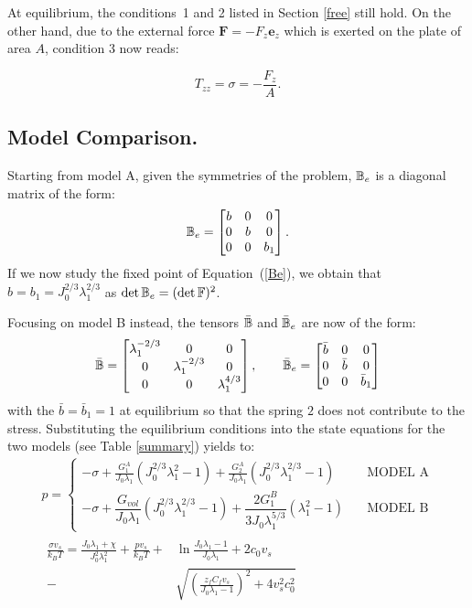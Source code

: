 At equilibrium, the conditions~1 and 2 listed in Section \ref{free} still hold. On the other hand, due to the external force $\mathbf{F}= -F_z \mathbf{e}_z$ which is exerted on the plate of area $A$, condition 3 now reads:

\begin{equation}
T_{zz}=\sigma = -\frac{F_z}{A}.
\end{equation} 

\subsection{Model Comparison.}
\label{data}
Starting from model A, given the symmetries of the problem, $\mathbb{B}_e$ is a diagonal matrix of the form:
\begin{equation}
\mathbb{B}_e=\begin{bmatrix}
b &0&0\\
0&b&0\\
0&0& b_1
\end{bmatrix}. 
\end{equation}
If we now study the fixed point of Equation~(\ref{Be}), we obtain that $b=b_1=J_0^{2/3}\lambda_1^{2/3}$ as $\det \mathbb{B}_e= (\det \mathbb{F})^2$.

Focusing on model B instead, the tensors $\bar{\mathbb{B}}$ and $\bar{\mathbb{B}}_e$ are now of the form:
\begin{equation}
\bar{\mathbb{B}}=\begin{bmatrix}
\lambda_1^{-2/3} &0&0\\
0&\lambda_1^{-2/3}&0\\
0&0& \lambda_1^{4/3}
\end{bmatrix}, \qquad
\bar{\mathbb{B}}_e=\begin{bmatrix}
\bar{b} &0&0\\
0&\bar{b}&0\\
0&0& \bar{b}_1
\end{bmatrix}
\end{equation}
with the $\bar{b}=\bar{b}_1=1$ at equilibrium so that the spring $2$ does not contribute to the stress. Substituting the equilibrium conditions into the state equations for the two models (see Table \ref{summary}) yields to:
\begin{gather}
p = \begin{cases}
\displaystyle
-\sigma + \frac{G^A_1}{J_0\lambda_1} (J^{2/3}_0\lambda_1^2-1)+\frac{G^A_2}{J_0\lambda_1} (J_0^{2/3} \lambda_1^{2/3}-1) &\quad \text{MODEL A} \\[10pt]
-\sigma + \dfrac{G_{vol}}{J_0\lambda_1}(J_0^{2/3}\lambda_1^{2/3}-1)+\dfrac{2G^B_1}{3J_0\lambda_1^{5/3}} (\lambda_1^2-1) &\quad \text{MODEL B}
\end{cases}\\[10pt]
\begin{aligned}
\frac{\sigma v_s}{k_B T}=\frac{J_0\lambda_1+\chi}{J_0^2\lambda^2_1}+\frac{pv_s}{k_B T}+&\ln \frac{J_0\lambda_1-1}{J_0\lambda_1} +2c_0v_s\\
-\ &\sqrt{\left(\frac{z_fC_fv_s}{J_0\lambda_1-1}\right)^2+4v_s^2c^2_0}
\end{aligned}\label{compA}
\end{gather}

